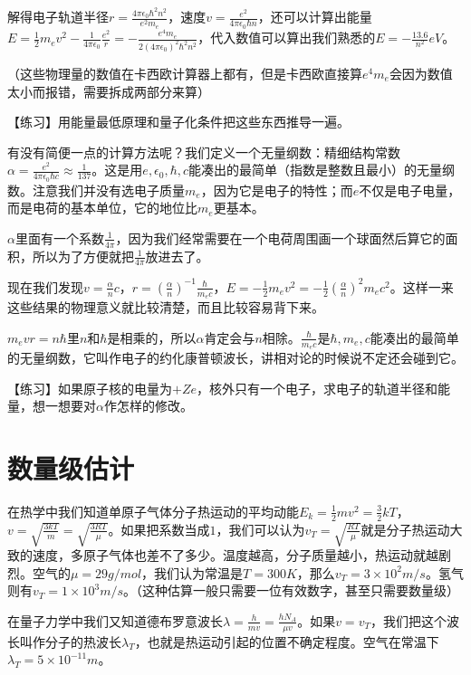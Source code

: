 解得电子轨道半径$r=\frac{4 \pi \epsilon_0 \hbar^2 n^2}{e^2 m_e}$，速度$v=\frac{e^2}{4 \pi \epsilon_0 \hbar n}$，还可以计算出能量$E=\frac{1}{2} m_e v^2-\frac{1}{4 \pi \epsilon_0} \frac{e^2}{r}=-\frac{e^4 m_e}{2 (4 \pi \epsilon_0)^2 \hbar^2 n^2}$，代入数值可以算出我们熟悉的$E=-\frac{13.6}{n^2} \unit{eV}$。

（这些物理量的数值在卡西欧计算器上都有，但是卡西欧直接算$e^4 m_e$会因为数值太小而报错，需要拆成两部分来算）

【练习】用能量最低原理和量子化条件把这些东西推导一遍。

有没有简便一点的计算方法呢？我们定义一个无量纲数：精细结构常数$\alpha=\frac{e^2}{4 \pi \epsilon_0 \hbar c} \approx \frac{1}{137}$。这是用$e,\epsilon_0,\hbar,c$能凑出的最简单（指数是整数且最小）的无量纲数。注意我们并没有选电子质量$m_e$，因为它是电子的特性；而$e$不仅是电子电量，而是电荷的基本单位，它的地位比$m_e$更基本。

$\alpha$里面有一个系数$\frac{1}{4 \pi}$，因为我们经常需要在一个电荷周围画一个球面然后算它的面积，所以为了方便就把$\frac{1}{4 \pi}$放进去了。

现在我们发现$v=\frac{\alpha}{n} c$，$r=(\frac{\alpha}{n})^{-1} \frac{\hbar}{m_e c}$，$E=-\frac{1}{2} m_e v^2=-\frac{1}{2} (\frac{\alpha}{n})^2 m_e c^2$。这样一来这些结果的物理意义就比较清楚，而且比较容易背下来。

$m_e v r =n \hbar$里$n$和$\hbar$是相乘的，所以$\alpha$肯定会与$n$相除。$\frac{\hbar}{m_e c}$是$\hbar,m_e,c$能凑出的最简单的无量纲数，它叫作电子的约化康普顿波长，讲相对论的时候说不定还会碰到它。

【练习】如果原子核的电量为$+Z e$，核外只有一个电子，求电子的轨道半径和能量，想一想要对$\alpha$作怎样的修改。
\section{数量级估计}
在热学中我们知道单原子气体分子热运动的平均动能$E_k=\frac{1}{2} m v^2=\frac{3}{2} k T$，$v=\sqrt{\frac{3 k T}{m}}=\sqrt{\frac{3 R T}{\mu}}$。如果把系数当成$1$，我们可以认为$v_T=\sqrt{\frac{R T}{\mu}}$就是分子热运动大致的速度，多原子气体也差不了多少。温度越高，分子质量越小，热运动就越剧烈。空气的$\mu=29 \unit{g/mol}$，我们认为常温是$T=300 \unit{K}$，那么$v_T=3 \times 10^2 \unit{m/s}$。氢气则有$v_T=1 \times 10^3 \unit{m/s}$。（这种估算一般只需要一位有效数字，甚至只需要数量级）

在量子力学中我们又知道德布罗意波长$\lambda=\frac{h}{m v}=\frac{h N_A}{\mu v}$。如果$v=v_T$，我们把这个波长叫作分子的热波长$\lambda_T$，也就是热运动引起的位置不确定程度。空气在常温下$\lambda_T=5 \times 10^{-11} \unit{m}$。

